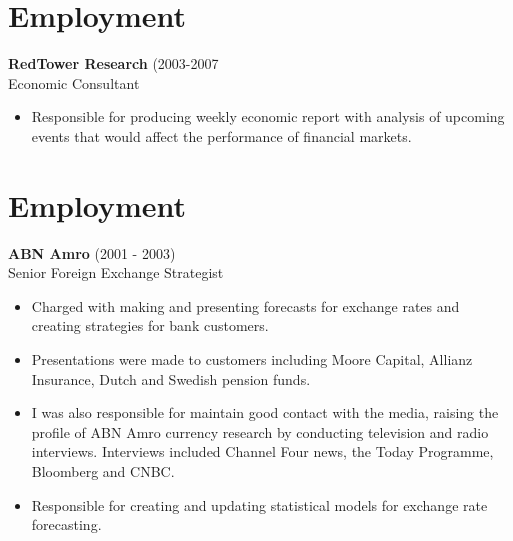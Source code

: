 \documentclass[margin,11pt]{res} %
\begin{document}
\begin{resume}
\section{Employment}      
     {\bf RedTower Research} (2003-2007  \\
                Economic Consultant \\ 
\begin{itemize} 
\item Responsible for producing weekly economic report with analysis of upcoming events that would affect the performance of financial markets.  
\end{itemize}

\section{Employment}
 {\bf ABN Amro} (2001 - 2003)\\
Senior Foreign Exchange Strategist\\
\begin{itemize} 
\item  Charged with making and presenting forecasts for exchange rates and creating strategies for bank customers.   
\item Presentations were made to customers including Moore Capital, Allianz Insurance, Dutch and Swedish pension funds. 
\item  I was also responsible for maintain good contact with the media, raising the profile of ABN Amro currency research by conducting television and radio interviews.  Interviews included Channel Four news, the Today Programme, Bloomberg and CNBC.   
\item Responsible for creating and updating statistical models for exchange rate forecasting.  
\end{itemize}


\end{resume}
\end{document}
